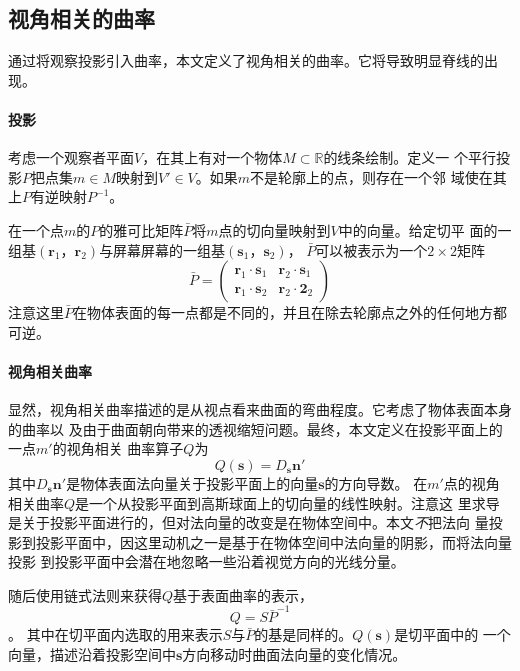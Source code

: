 \documentclass[10pt,a4paper]{article}
\theoremstyle{mythm}%
\numberwithin{equation}{section}
\begin{document}
\begin{CJK*}{UTF8}{wqyzh}
\subsection{视角相关的曲率}

通过将观察投影引入曲率，本文定义了视角相关的曲率。它将导致明显脊线的出现。

\paragraph*{投影}
考虑一个观察者平面$V$，在其上有对一个物体$M\subset\mathbb{R}$的线条绘制。定义一
个平行投影$P$把点集$m\in M$映射到$V'\in V$。如果$m$不是轮廓上的点，则存在一个邻
域使在其上$P$有逆映射$P^{-1}$。

在一个点$m$的$P$的雅可比矩阵$\bar{P}$将$m$点的切向量映射到$V$中的向量。给定切平
面的一组基$(\bm{r}_1，\bm{r}_2)$与屏幕屏幕的一组基$(\bm{s}_1，\bm{s}_2)$，
$\bar{P}$可以被表示为一个$2\times2$矩阵
\begin{equation}
    \bar{P}=
        \begin{pmatrix}
            \bm{r}_1 \cdot \bm{s}_1 & \bm{r}_2 \cdot \bm{s}_1 \\
            \bm{r}_1 \cdot \bm{s}_2 & \bm{r}_2 \cdot \bm{2}_2
        \end{pmatrix}
\end{equation}
注意这里$\bar{P}$在物体表面的每一点都是不同的，并且在除去轮廓点之外的任何地方都
可逆。

\paragraph*{视角相关曲率}
显然，视角相关曲率描述的是从视点看来曲面的弯曲程度。它考虑了物体表面本身的曲率以
及由于曲面朝向带来的透视缩短问题。最终，本文定义在投影平面上的一点$m'$的视角相关
曲率算子$Q$为
\begin{equation}
    Q(\bm{s})=D_{\bm{s}}\bm{n'}
\end{equation}
其中$D_{\bm{s}}\bm{n'}$是物体表面法向量关于投影平面上的向量$\bm{s}$的方向导数。
在$m'$点的视角相关曲率$Q$是一个从投影平面到高斯球面上的切向量的线性映射。注意这
里求导是关于投影平面进行的，但对法向量的改变是在物体空间中。本文\emph{不}把法向
量投影到投影平面中，因这里动机之一是基于在物体空间中法向量的阴影，而将法向量投影
到投影平面中会潜在地忽略一些沿着视觉方向的光线分量。

随后使用链式法则来获得$Q$基于表面曲率的表示，
\begin{equation}
    \boxed{Q=S\bar{P}^{-1}}
\end{equation}。
其中在切平面内选取的用来表示$S$与$\bar{P}$的基是同样的。$Q(\bm{s})$是切平面中的
一个向量，描述沿着投影空间中$\bm{s}$方向移动时曲面法向量的变化情况。


\end{CJK*}
\end{document}
